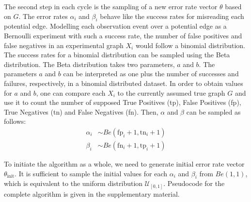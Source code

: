 \documentclass{bioinfo}
\newcommand{\prob}{\mathbb{P}}
\begin{document}
\begin{methods}
The second step in each cycle is the sampling of a new error rate vector $\theta$ based on $G$. The error rates $\alpha_i$ and $\beta_i$ behave like the success rates for misreading each potential edge. Modelling each observation event over a potential edge as a Bernoulli experiment with such a success rate, the number of false positives and false negatives in an experimental graph $X_i$ would follow a binomial distribution. The success rates for a binomial distribution can be sampled using the Beta distribution. The Beta distribution takes two parameters, $a$ and $b$. The parameters $a$ and $b$ can be interpreted as one plus the number of successes and failures, respectively, in a binomial distributed dataset. In order to obtain values for $a$ and $b$, one can compare each $X_i$ to the currently assumed true graph $G$ and use it to count the number of supposed True Positives (tp), False Positives (fp), True Negatives (tn) and False Negatives (fn). Then, $\alpha$ and $\beta$ can be sampled as follows:
\begin{align}
  \alpha_i &\sim Be(\text{fp}_i+1, \text{tn}_i+1)\\
  \beta_i &\sim Be(\text{fn}_i+1, \text{tp}_i+1)
\end{align}

To initiate the algorithm as a whole, we need to generate initial error rate vector $\theta_{\text{init}}$. It is sufficient to sample the initial values for each $\alpha_i$ and $\beta_i$ from $Be(1,1)$, which is equivalent to the uniform distribution $\mathcal{U}_{[0,1]}$. Pseudocode for the complete algorithm is given in the supplementary material.







\end{methods}
\end{document}
